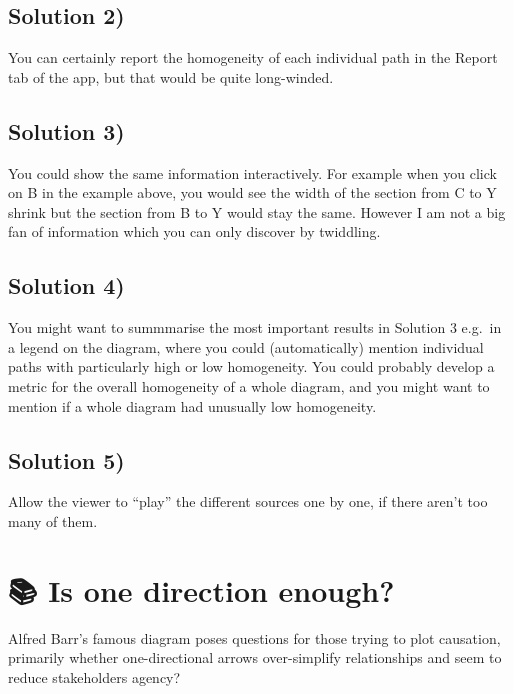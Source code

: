 \documentclass[
]{book}
\begin{document}
\hypertarget{solution-2}{%
\section{Solution 2)}\label{solution-2}}

You can certainly report the homogeneity of each individual path in the Report tab of the app, but that would be quite long-winded.

\hypertarget{solution-3}{%
\section{Solution 3)}\label{solution-3}}

You could show the same information interactively. For example when you click on B in the example above, you would see the width of the section from C to Y shrink but the section from B to Y would stay the same. However I am not a big fan of information which you can only discover by twiddling.

\hypertarget{solution-4}{%
\section{Solution 4)}\label{solution-4}}

You might want to summmarise the most important results in Solution 3 e.g.~in a legend on the diagram, where you could (automatically) mention individual paths with particularly high or low homogeneity. You could probably develop a metric for the overall homogeneity of a whole diagram, and you might want to mention if a whole diagram had unusually low homogeneity.

\hypertarget{solution-5}{%
\section{Solution 5)}\label{solution-5}}

Allow the viewer to ``play'' the different sources one by one, if there aren't too many of them.

\hypertarget{is-one-direction-enough}{%
\chapter{📚 Is one direction enough?}\label{is-one-direction-enough}}

Alfred Barr's famous diagram poses questions for those trying to plot causation, primarily whether one-directional arrows over-simplify relationships and seem to reduce stakeholders agency?
\end{document}
